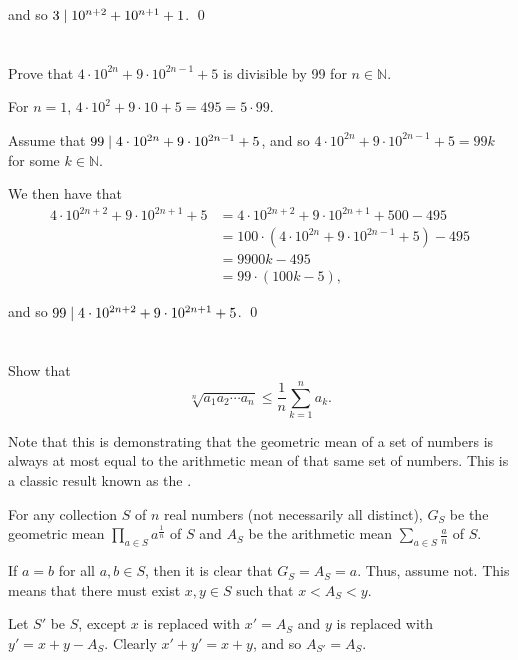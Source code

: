 and so $3 \mid 10^{n+2} + 10^{n+1} + 1$.
\qed
\pagebreak
\section{}\label{sec:2-6}

Prove that $4 \cdot 10^{2n} + 9 \cdot 10^{2n-1} + 5$ is divisible by 99 for $n \in \mathbb{N}$.
\hr

For $n=1$, $4 \cdot 10^2 + 9 \cdot 10 + 5 = 495 = 5 \cdot 99$.

\medskip

Assume that $99 \mid 4 \cdot 10^{2n} + 9 \cdot 10^{2n-1} + 5$, and so $4 \cdot 10^{2n} + 9 \cdot 10^{2n-1} + 5 = 99k$ for some $k \in \mathbb{N}$.

\medskip

We then have that
\begin{align*}
    4 \cdot 10^{2n+2} + 9 \cdot 10^{2n+1} + 5 &= 4 \cdot 10^{2n+2} + 9 \cdot 10^{2n+1} + 500 - 495 \\
    &= 100 \cdot (4 \cdot 10^{2n} + 9 \cdot 10^{2n-1} + 5) - 495 \\
    &= 9900k - 495 \\
    &= 99 \cdot (100k - 5),
\end{align*}

and so $99 \mid 4 \cdot 10^{2n+2} + 9 \cdot 10^{2n+1} + 5$.
\qed

\section{}\label{sec:2-7}

Show that
\[\sqrt[n]{a_1 a_2 \cdots a_n} \leq \frac{1}{n} \sum_{k=1}^n a_k.\]

\hr

Note that this is demonstrating that the geometric mean of a set of numbers is always at most equal to the arithmetic mean of that same set of numbers. This is a classic result known as the .

\bigskip

For any collection $S$ of $n$ real numbers (not necessarily all distinct), $G_S$ be the geometric mean $\prod_{a \in S} a^{\frac{1}{n}}$ of $S$ and $A_S$ be the arithmetic mean $\sum_{a \in S} \frac{a}{n}$ of $S$.

If $a = b$ for all $a, b \in S$, then it is clear that $G_S = A_S = a$. Thus, assume not. This means that there must exist $x, y \in S$ such that $x < A_S < y$.

Let $S'$ be $S$, except $x$ is replaced with $x' = A_S$ and $y$ is replaced with $y' = x + y - A_S$. Clearly $x' + y' = x + y$, and so $A_{S'} = A_S$.

